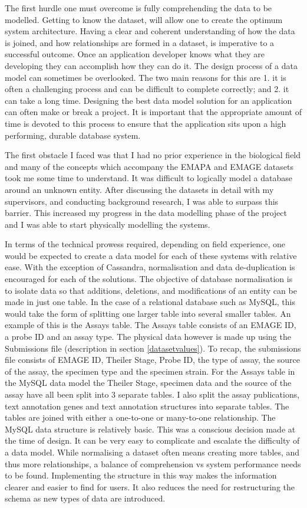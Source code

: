 The first hurdle one must overcome is fully comprehending the data to be modelled. Getting to know the dataset, will allow one to create the optimum system architecture. Having a clear and coherent understanding of how the data is joined, and how relationships are formed in a dataset, is imperative to a successful outcome. Once an application developer knows what they are developing they can accomplish how they can do it. The design process of a data model can sometimes be overlooked. The two main reasons for this are 1. it is often a challenging process and can be difficult to complete correctly; and 2. it can take a long time. Designing the best data model solution for an application can often make or break a project. It is important that the appropriate amount of time is devoted to this process to ensure that the application sits upon a high performing, durable database system.

The first obstacle I faced was that I had no prior experience in the biological field and many of the concepts which accompany the EMAPA and EMAGE datasets took me some time to understand. It was difficult to logically model a database around an unknown entity. After discussing the datasets in detail with my supervisors, and conducting background research, I was able to surpass this barrier. This increased my progress in the data modelling phase of the project and I was able to start physically modelling the systems.

In terms of the technical prowess required, depending on field experience, one would be expected to create a data model for each of these systems with relative ease. With the exception of Cassandra, normalisation and data de-duplication is encouraged for each of the solutions. The objective of database normalisation is to isolate data so that additions, deletions, and modifications of an entity can be made in just one table. In the case of a relational database such as MySQL, this would take the form of splitting one larger table into several smaller tables. An example of this is the Assays table. The Assays table consists of an EMAGE ID, a probe ID and an assay type. The physical data however is made up using the Submissions file (description in section \ref{datasetvalues}). To recap, the submissions file consists of EMAGE ID, Theiler Stage, Probe ID, the type of assay, the source of the assay, the specimen type and the specimen strain. For the Assays table in the MySQL data model the Theiler Stage, specimen data and the source of the assay have all been split into 3 separate tables. I also split the assay publications, text annotation genes and text annotation structures into separate tables. The tables are joined with either a one-to-one or many-to-one relationship. The MySQL data structure is relatively basic. This was a conscious decision made at the time of design. It can be very easy to complicate and escalate the difficulty of a data model. While normalising a dataset often means creating more tables, and thus more relationships, a balance of comprehension vs system performance needs to be found. Implementing the structure in this way makes the information clearer and easier to find for users. It also reduces the need for restructuring the schema as new types of data are introduced.

